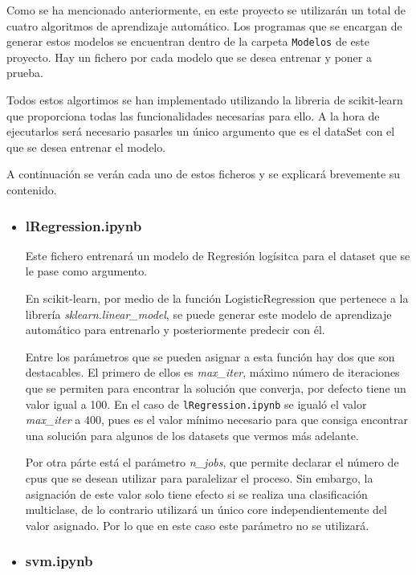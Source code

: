 \documentclass[a4paper, 12pt]{book}
\begin{document}
Como se ha mencionado anteriormente, en este proyecto se utilizarán un total de cuatro algoritmos de aprendizaje automático. Los programas que se encargan de generar estos modelos se encuentran dentro de la carpeta \texttt{Modelos} de este proyecto. Hay un fichero por cada modelo que se desea entrenar y poner a prueba.

Todos estos algortimos se han implementado utilizando la libreria de scikit-learn que proporciona todas las funcionalidades necesarias para ello. A la hora de ejecutarlos será necesario pasarles un único argumento que es el dataSet con el que se desea entrenar el modelo.

A continuación se verán cada uno de estos ficheros y se explicará brevemente su contenido.

\begin{itemize}

\item \subsubsection{lRegression.ipynb}
\label{subsubsec:lRegression}

Este fichero entrenará un modelo de Regresión logísitca para el dataset que se le pase como argumento.

En scikit-learn, por medio de la función LogisticRegression\cite{LogisticRegressionDoc} que pertenece a la librería \textit{sklearn.linear\_model}, se puede generar este modelo de aprendizaje automático para entrenarlo y posteriormente predecir con él. 

Entre los parámetros que se pueden asignar a esta función hay dos que son destacables. El primero de ellos es \textit{max\_iter}, máximo número de iteraciones que se permiten para encontrar la solución que converja, por defecto tiene un valor igual a 100. En el caso de \texttt{lRegression.ipynb} se igualó el valor \textit{max\_iter} a 400, pues es el valor mínimo necesario para que consiga encontrar una solución para algunos de los datasets que vermos más adelante.

Por otra párte está el parámetro \textit{n\_jobs}, que permite declarar el número de cpus que se desean utilizar para paralelizar el proceso. Sin embargo, la asignación de este valor solo tiene efecto si se realiza una clasificación multiclase, de lo contrario utilizará un único core independientemente del valor asignado. Por lo que en este caso este parámetro no se utilizará.

\item \subsubsection{svm.ipynb} 
\label{subsubsub:svm}


\end{itemize}
\end{document}
